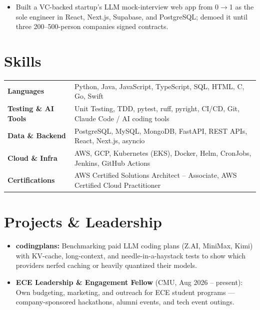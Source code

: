 \documentclass[11pt, letterpaper]{article}
\begin{document}
\vspace{1pt}
\begin{itemize}
  \item Built a VC-backed startup's LLM mock-interview web app from 0$\to$1 as the sole engineer in React, Next.js, Supabase, and PostgreSQL; demoed it until three 200--500-person companies signed contracts.
\end{itemize}

\section{Skills}
\begin{tabularx}{\textwidth}{@{}l @{\hspace{7pt}} >{\raggedright\arraybackslash}X@{}}
  \textbf{Languages} & Python, Java, JavaScript, TypeScript, SQL, HTML, C, Go, Swift \\[1pt]
  \textbf{Testing \& AI Tools} & Unit Testing, TDD, pytest, ruff, pyright, CI/CD, Git, Claude Code / AI coding tools \\[1pt]
  \textbf{Data \& Backend} & PostgreSQL, MySQL, MongoDB, FastAPI, REST APIs, React, Next.js, asyncio \\[1pt]
  \textbf{Cloud \& Infra} & AWS, GCP, Kubernetes (EKS), Docker, Helm, CronJobs, Jenkins, GitHub Actions \\[1pt]
  \textbf{Certifications} & AWS Certified Solutions Architect -- Associate, AWS Certified Cloud Practitioner \\
\end{tabularx}

\section{Projects \& Leadership}
\begin{itemize}
  \item \textbf{codingplans:} Benchmarking paid LLM coding plans (Z.AI, MiniMax, Kimi) with KV-cache, long-context, and needle-in-a-haystack tests to show which providers nerfed caching or heavily quantized their models.
  \item \textbf{ECE Leadership \& Engagement Fellow} (CMU, Aug 2026 -- present): Own budgeting, marketing, and outreach for ECE student programs --- company-sponsored hackathons, alumni events, and tech event outings.
\end{itemize}
\end{document}

